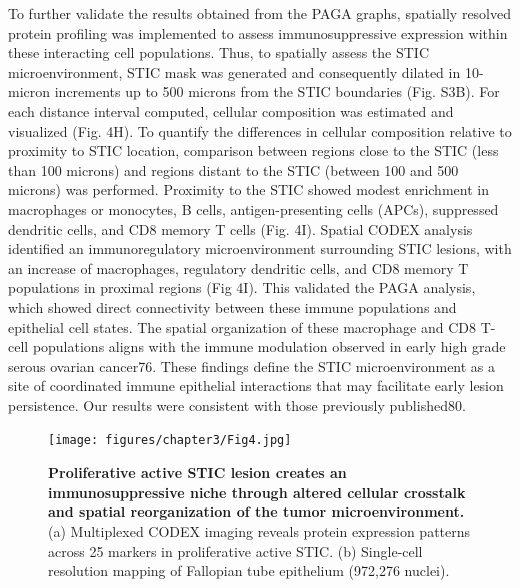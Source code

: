 \begin{refsection}
    To further validate the results obtained from the PAGA graphs, spatially resolved protein profiling was implemented to assess immunosuppressive expression within these interacting cell populations. Thus, to spatially assess the STIC microenvironment, STIC mask was generated and consequently dilated in 10-micron increments up to 500 microns from the STIC boundaries (Fig. S3B). For each distance interval computed, cellular composition was estimated and visualized (Fig. 4H). To quantify the differences in cellular composition relative to proximity to STIC location, comparison between regions close to the STIC (less than 100 microns) and regions distant to the STIC (between 100 and 500 microns) was performed. Proximity to the STIC showed modest enrichment in macrophages or monocytes, B cells, antigen-presenting cells (APCs), suppressed dendritic cells, and CD8 memory T cells (Fig. 4I).
    Spatial CODEX analysis identified an immunoregulatory microenvironment surrounding STIC lesions, with an increase of macrophages, regulatory dendritic cells, and CD8 memory T populations in proximal regions (Fig 4I). This validated the PAGA analysis, which showed direct connectivity between these immune populations and epithelial cell states. The spatial organization of these macrophage and CD8 T-cell populations aligns with the immune modulation observed in early high grade serous ovarian cancer76. These findings define the STIC microenvironment as a site of coordinated immune epithelial interactions that may facilitate early lesion persistence. Our results were consistent with those previously published80.

    \begin{figure}[p]
        \begin{center}
            \texttt{[image: figures/chapter3/Fig4.jpg]}
            \captionsetup{font=small}
            \caption{ \textbf{Proliferative active STIC lesion creates an immunosuppressive niche through altered cellular crosstalk and spatial reorganization of the tumor microenvironment.} (a) Multiplexed CODEX imaging reveals protein expression patterns across 25 markers in proliferative active STIC. (b) Single-cell resolution mapping of Fallopian tube epithelium (972,276 nuclei).}
            \label{chapter3_fig4}
        \end{center}
    \end{figure}
    

\end{refsection}
